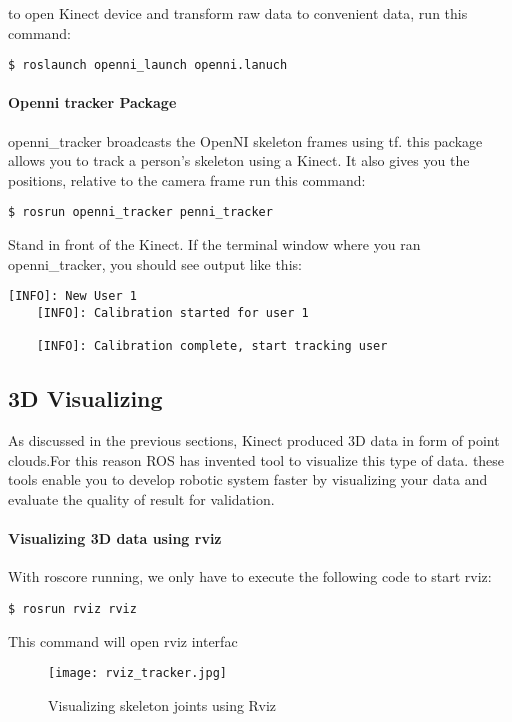 to open Kinect device and transform raw data to convenient data, run this command:
\begin{lstlisting}[language=terCmd]
$ roslaunch openni_launch openni.lanuch
\end{lstlisting}


\paragraph{Openni tracker Package}
openni\_tracker broadcasts the OpenNI skeleton frames using tf.
this package allows you to track a person's skeleton using a Kinect. It also gives you the positions, relative to the camera frame
run this command:
\begin{lstlisting}[language=terCmd]
$ rosrun openni_tracker penni_tracker
\end{lstlisting}

Stand in front of the Kinect. If the terminal window where you ran openni\_tracker, you should see output like this:
\begin{lstlisting}[language=terCmd]
    [INFO]: New User 1
    [INFO]: Calibration started for user 1
    
    [INFO]: Calibration complete, start tracking user
\end{lstlisting}

\subsection{3D Visualizing}
As discussed in the previous sections, Kinect produced 3D data in form of point clouds.For this reason ROS has invented tool to visualize this type of data.
these tools enable you to develop robotic system faster by visualizing your data and evaluate the quality of result for validation.
\paragraph{Visualizing 3D data using rviz}
With roscore running, we only have to execute the following code to start rviz:
\begin{lstlisting}[language=terCmd]
$ rosrun rviz rviz
\end{lstlisting}

This command will open rviz interfac
\begin{figure}[ht]
	\centering
	\texttt{[image: rviz\_tracker.jpg]}
    	\caption{Visualizing skeleton joints using Rviz}
\end{figure}